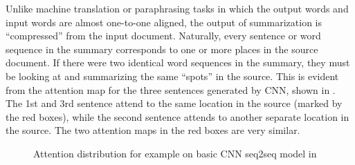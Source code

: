 Unlike machine translation or paraphrasing tasks in which the output words
and input words are almost one-to-one aligned, the output of summarization
is ``compressed'' from the input document. Naturally, every sentence or 
word sequence in the summary corresponds to one or more places in the source
document. If there were two identical word sequences in the summary,
they must be looking at and summarizing the same ``spots'' in the source.
This is evident from the attention map for the three sentences generated by 
CNN, shown in . The 1st and 3rd sentence attend to
the same location in the source (marked by the red boxes), while the second
sentence attends to another separate location in the source. The two
attention maps in the red boxes are very similar.

\begin{figure}[th!]
\centering
{}
\quad
{}
\quad
{}
\caption{Attention distribution for example on basic CNN seq2seq model 
in }
\label{fig:attn_map}
\end{figure}


